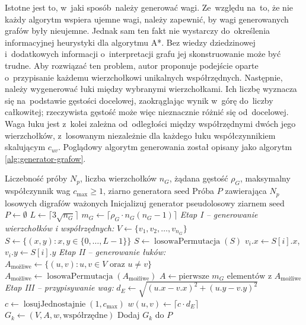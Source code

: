 \documentclass[11pt,a4paper,oneside]{report}
\begin{document}
Istotne jest to, w~jaki sposób należy generować wagi. Ze~względu na~to, że nie każdy algorytm wspiera ujemne wagi, należy zapewnić, by wagi generowanych grafów były nieujemne. Jednak sam ten fakt nie wystarczy do~określenia informacyjnej heurystyki dla algorytmu A*. Bez wiedzy dziedzinowej i~dodatkowych informacji o~interpretacji grafu jej skonstruowanie może być trudne. Aby rozwiązać ten problem, autor proponuje podejście oparte o~przypisanie każdemu wierzchołkowi unikalnych współrzędnych. Następnie, należy wygenerować łuki między wybranymi wierzchołkami. Ich liczbę wyznacza się na~podstawie gęstości docelowej, zaokrąglając wynik w~górę do~liczby całkowitej; rzeczywista gęstość może więc nieznacznie różnić się od~docelowej. Waga łuku jest z~kolei zależna od~odległości między współrzędnymi dwóch jego wierzchołków, z~losowanym niezależnie dla każdego łuku współczynnikiem skalującym $c_{uv}$. Poglądowy algorytm generowania został opisany jako algorytm \ref{alg:generator-grafow}.

\begin{algorithm}[H]
  \caption{Generowanie próby losowych grafów skierowanych}
  \label{alg:generator-grafow}
  \small
  \begin{algorithmic}[1]
    \Require Liczebność próby $N_p$, liczba wierzchołków $n_G$, żądana gęstość $\rho_G$, maksymalny współczynnik wag $c_{\max} \ge 1$, ziarno generatora $\text{seed}$
    \Ensure Próba $P$ zawierająca $N_p$ losowych digrafów ważonych
    \State Inicjalizuj generator pseudolosowy ziarnem $\text{seed}$
    \State $P \gets \emptyset$
    \State $L \gets \lceil 3\sqrt{n_G}\rceil$
    \State $m_G \gets \lceil \rho_G \cdot n_G(n_G - 1)\rceil$
      \Statex \textit{\quad Etap I -- generowanie wierzchołków i współrzędnych:}
      \State $V \gets \{v_1, v_2, \ldots, v_{n_G}\}$
      \State $S \gets \{(x, y) : x, y \in \{0, \ldots, L - 1\}\}$
      \State $S \gets \operatorname{losowaPermutacja}(S)$
        \State $v_i.x \gets S[i].x$, $v_i.y \gets S[i].y$
      \EndFor
      \Statex \textit{\quad Etap II -- generowanie łuków:}
      \State $A_{\mathrm{możliwe}} \gets \{(u, v) : u, v \in V \text{ oraz } u \neq v\}$
      \State $A_{\mathrm{możliwe}} \gets \operatorname{losowaPermutacja}(A_{\mathrm{możliwe}})$
      \State $A \gets \text{pierwsze } m_G \text{ elementów z } A_{\mathrm{możliwe}}$
      \Statex \textit{\quad Etap III -- przypisywanie wag:}
        \State $d_E \gets \sqrt{(u.x - v.x)^2 + (u.y - v.y)^2}$
        \State $c \gets \operatorname{losujJednostajnie}(1, c_{\max})$
        \State $w(u, v) \gets \lceil c \cdot d_E\rceil$
      \EndFor
      \State $G_k \gets (V, A, w, \text{współrzędne})$
      \State Dodaj $G_k$ do $P$
    \EndFor
    \State {}
  \end{algorithmic}
\end{algorithm}
\end{document}
